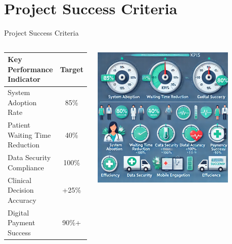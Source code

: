 \documentclass[aspectratio=169]{beamer}
\begin{document}
\section{Project Success Criteria}
\begin{frame}{Project Success Criteria}
    \begin{columns}[T]
            \begin{center}
                \begin{tabular}{lc}
                    \toprule
                    \textbf{Key Performance Indicator} & \textbf{Target} \\
                    \midrule
                    System Adoption Rate & 85\% \\
                    Patient Waiting Time Reduction & 40\% \\
                    Data Security Compliance & 100\% \\
                    Clinical Decision Accuracy & +25\% \\
                    Digital Payment Success & 90\%+ \\
                    \bottomrule
                \end{tabular}
            \end{center}
            \hspace{0.5cm}\includegraphics[width=0.8\textwidth]{kpi_illustration.png}
    \end{columns}
\end{frame}
\end{document}
